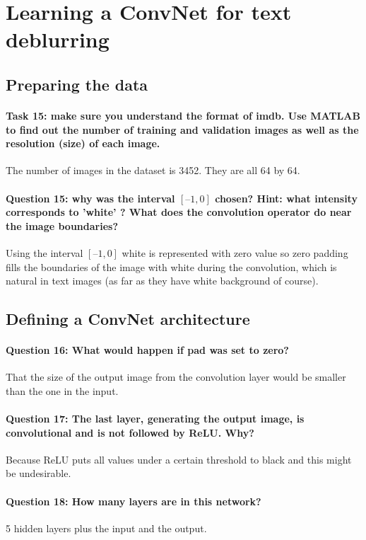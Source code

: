 \documentclass[12pt]{article}
\begin{document}
\section{Learning a ConvNet for text deblurring}
\subsection{Preparing the data}

\paragraph{Task 15: make sure you understand the format of imdb. Use MATLAB to find out the number of training and validation images as well as the resolution (size) of each image.} The number of images in the dataset is 3452. They are all 64 by 64.
\paragraph{Question 15: why was the interval \([–1,0]\) chosen? Hint: what intensity corresponds to ’white’ ? What does the convolution operator do near the image boundaries?} Using the interval \([–1,0]\) white is represented with zero value so zero padding fills the boundaries of the image with white during the convolution, which is natural in text images (as far as they have white background of course).
\subsection{Defining a ConvNet architecture}
\paragraph{Question 16: What would happen if pad was set to zero? } That the size of the output image from the convolution layer would be smaller than the one in the input.
\paragraph{Question 17: The last layer, generating the output image, is convolutional and is not followed by ReLU. Why?} Because ReLU puts all values under a certain threshold to black and this might be undesirable.
\paragraph{Question 18: How many layers are in this network?} 5 hidden layers plus the input and the output.
\end{document}
